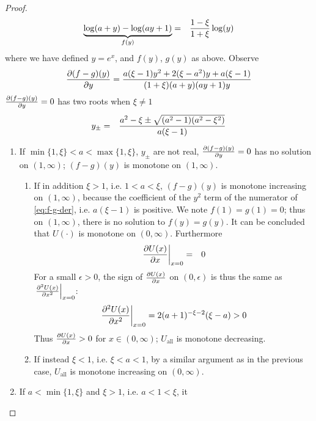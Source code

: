 \begin{subappendices}
\begin{proof}
\begin{eqnarray*}
    \underbrace{\log(a + y) - \log(a y + 1)}_{f(y)} &=&
    {1 -\xi \over 1+\xi} \log(y)
  \end{eqnarray*}
  where we have defined $y = e^x$, and $f(y)$, $g(y)$ as above. Observe
  \begin{equation}
    \label{eq:f-g-der}
    {\partial(f -g)(y) \over \partial y} = {
      a (\xi - 1) y^2 + 2 (\xi - a^2) y + a(\xi - 1)
      \over
      (1 + \xi) (a + y) (a y + 1) y
    }
  \end{equation}
  ${\partial (f -g)(y) \over \partial y} = 0$ has two roots when $\xi \ne 1$
  \begin{eqnarray*}
    y_\pm &=& {
      a^2 - \xi \pm \sqrt{(a^2 - 1) (a^2 - \xi^2)}
      \over
      a (\xi - 1)
    }
  \end{eqnarray*}
  \begin{enumerate}
  \item If $\min\{1, \xi\} < a < \max\{1, \xi\}$, $y_\pm$ are not
    real, ${\partial (f -g)(y) \over \partial y} = 0$ has no solution on
    $(1, \infty)$; $(f -g)(y)$ is monotone on $(1, \infty)$.
    \begin{enumerate}
    \item If in addition $\xi > 1$, i.e. $1 < a < \xi$, $(f - g)(y)$
      is monotone increasing on $(1, \infty)$, because the
      coefficient of the $y^2$ term of the numerator of
      \eqref{eq:f-g-der}, i.e. $a (\xi - 1)$ is positive. We note
      $f(1) = g(1) = 0$; thus on $(1, \infty)$, there is no solution
      to $f(y) = g(y)$. It can be concluded that $U(\cdot)$ is
      monotone on $(0, \infty)$. Furthermore
        \begin{eqnarray*}
          \left.{\partial U(x) \over \partial x}\right|_{x=0} &=& 0 \\
        \end{eqnarray*}
        For a small $\epsilon > 0$, the sign of ${\partial U(x) \over \partial
          x}$ on $(0, \epsilon)$ is thus the same as
        $\left.{\partial^2 U(x) \over \partial x^2}\right|_{x=0}$:
        \[
        \left.{\partial^2 U(x) \over \partial x^2}\right|_{x=0} =
        2 (a + 1)^{-\xi - 2} (\xi - a) > 0
        \]
        Thus ${\partial U(x) \over \partial x} > 0$ for $x \in (0, \infty)$;
        $U_{\text{all}}$ is monotone decreasing.
    \item If instead $\xi < 1$, i.e. $\xi < a < 1$, by a similar
      argument as in the previous case, $U_{\text{all}}$ is monotone
      increasing on $(0, \infty)$.
    \end{enumerate}
  \item If $a < \min\{1, \xi\}$ and $\xi > 1$, i.e. $a < 1 < \xi$, it

\end{enumerate}
\end{proof}
\end{subappendices}
